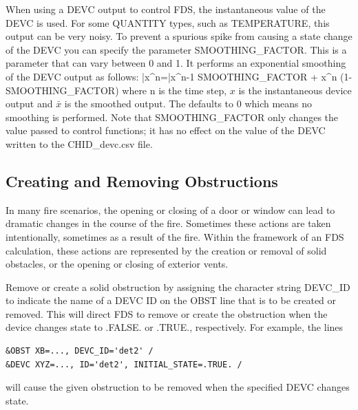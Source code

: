 \documentclass[11pt]{book}
\begin{document}
When using a {\ct DEVC} output to control FDS, the instantaneous value of the {\ct DEVC} is used.  For some {\ct QUANTITY} types, such as {\ct TEMPERATURE}, this output can be very noisy.  To prevent a spurious spike from causing a state change of the {\ct DEVC} you can specify the parameter {\ct SMOOTHING\_FACTOR}.  This is a parameter that can vary between 0 and 1.  It performs an exponential smoothing of the {\ct DEVC} output as follows:
\be
\bar{x}^n=\bar{x}^{n-1} \; \mbox{\ct SMOOTHING\_FACTOR} + x^n \; (1-\mbox{\ct SMOOTHING\_FACTOR})
\ee
where n is the time step, $x$ is the instantaneous device output and $\bar{x}$ is the smoothed output.  The  defaults to 0 which means no smoothing is performed.  Note that {\ct SMOOTHING\_FACTOR} only changes the value passed to control functions; it has no effect on the value of the {\ct DEVC} written to the {\ct CHID\_devc.csv} file.

\subsection{Creating and Removing Obstructions}
\label{info:create_remove}

In many fire scenarios, the opening or closing of a door or window can lead to dramatic changes in the course of the fire. Sometimes these actions are taken intentionally, sometimes as a result of the fire. Within the framework of an FDS calculation, these actions are represented by the creation or removal of solid obstacles, or the opening or closing of exterior vents.

Remove or create a solid obstruction by assigning the character string {\ct DEVC\_ID} to indicate the name of a {\ct DEVC} {\ct ID} on the {\ct OBST} line that is to be created or removed.  This will direct FDS to remove or create the obstruction when the device changes state to {\ct .FALSE.} or {\ct .TRUE.}, respectively. For example, the lines
\begin{lstlisting}
&OBST XB=..., DEVC_ID='det2' /
&DEVC XYZ=..., ID='det2', INITIAL_STATE=.TRUE. /
\end{lstlisting}
will cause the given obstruction to be removed when the specified {\ct DEVC} changes state.
\end{document}
